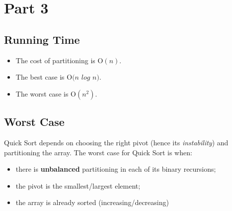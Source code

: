 \documentclass{article}
\begin{document}
\restoregeometry


\newpage
{}

\section{Part 3}

\subsection{Running Time}
\begin{itemize}
    \item The cost of partitioning is O$(n)$.
    \item The best case is O$(n$ $log$ $n)$.
    \item The worst case is O$(n^2)$.
\end{itemize}

\subsection{Worst Case}
Quick Sort depends on choosing the right pivot (hence its \textit{instability}) and partitioning the array. The worst case for Quick Sort is when:
\begin{itemize}
    \item there is \textbf{unbalanced} partitioning in each of its binary recursions;
    \item the pivot is the smallest/largest element;
    \item the array is already sorted (increasing/decreasing)
\end{itemize}
\end{document}
